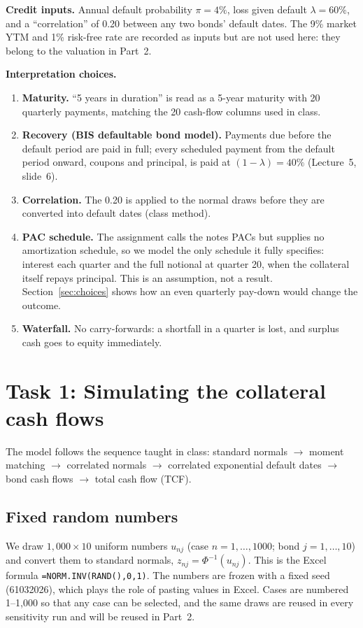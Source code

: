 \documentclass[11pt]{article}
\begin{document}
\noindent\textbf{Credit inputs.} Annual default probability $\pi = 4\%$, loss given default $\lambda = 60\%$, and a ``correlation''
of 0.20 between any two bonds' default dates. The 9\% market YTM and 1\% risk-free rate are recorded as inputs but are not used here:
they belong to the valuation in Part~2.

\medskip
\noindent\textbf{Interpretation choices.}
\begin{enumerate}
\item \textbf{Maturity.} ``5 years in duration'' is read as a 5-year maturity with 20 quarterly payments, matching the 20
cash-flow columns used in class.
\item \textbf{Recovery (BIS defaultable bond model).} Payments due before the default period are paid in full; every scheduled
payment from the default period onward, coupons and principal, is paid at $(1-\lambda) = 40\%$ (Lecture~5, slide~6).
\item \textbf{Correlation.} The 0.20 is applied to the normal draws before they are converted into default dates (class method).
\item \textbf{PAC schedule.} The assignment calls the notes PACs but supplies no amortization schedule, so we model the only
schedule it fully specifies: interest each quarter and the full notional at quarter 20, when the collateral itself repays principal.
This is an assumption, not a result. Section~\ref{sec:choices} shows how an even quarterly pay-down would change the outcome.
\item \textbf{Waterfall.} No carry-forwards: a shortfall in a quarter is lost, and surplus cash goes to equity immediately.
\end{enumerate}

\section{Task 1: Simulating the collateral cash flows}

The model follows the sequence taught in class: standard normals $\rightarrow$ moment matching $\rightarrow$ correlated normals
$\rightarrow$ correlated exponential default dates $\rightarrow$ bond cash flows $\rightarrow$ total cash flow (TCF).

\subsection{Fixed random numbers}
We draw $1{,}000 \times 10$ uniform numbers $u_{nj}$ (case $n = 1,\dots,1000$; bond $j = 1,\dots,10$) and convert them to
standard normals, $z_{nj} = \Phi^{-1}(u_{nj})$. This is the Excel formula \texttt{=NORM.INV(RAND(),0,1)}. The numbers are frozen
with a fixed seed (61032026), which plays the role of pasting values in Excel. Cases are numbered 1--1{,}000 so that any case can be
selected, and the same draws are reused in every sensitivity run and will be reused in Part~2.
\end{document}
